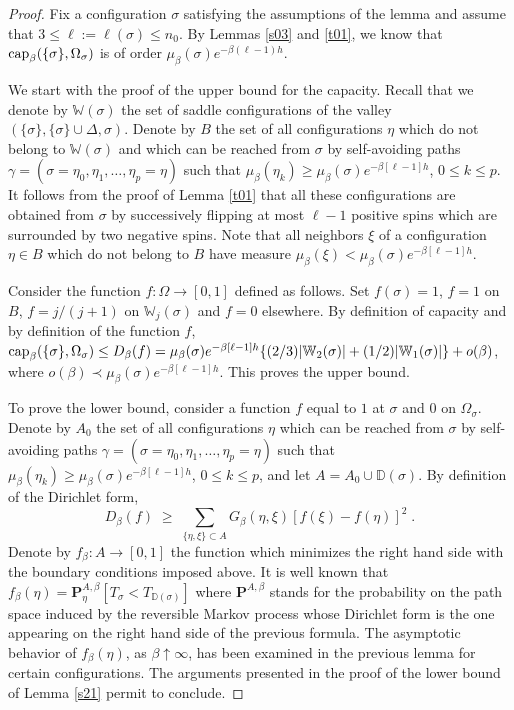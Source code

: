 \documentclass[reqno]{amsart}
\begin{document}
\begin{proof}
Fix a configuration $\sigma$ satisfying the assumptions of the lemma
and assume that $3\le \ell :=\ell(\sigma) \le n_0$. By Lemmas
\ref{s03} and \ref{t01}, we know that ${{\rm cap}}_\beta(\{\sigma\} ,
\Omega_\sigma)$ is of order $\mu_\beta (\sigma) e^{- \beta (\ell -1)
  h}$.

We start with the proof of the upper bound for the capacity.  Recall
that we denote by ${{\mathbb W}}(\sigma)$ the set of saddle configurations of
the valley $(\{\sigma\}, \{\sigma\} \cup \Delta, \sigma)$.  Denote by
$B$ the set of all configurations $\eta$ which do not belong to ${{\mathbb W}}(\sigma)$ and which can be reached from $\sigma$ by self-avoiding
paths $\gamma = (\sigma = \eta_0, \eta_1, \dots, \eta_p = \eta)$ such
that $\mu_\beta (\eta_k) \ge \mu_\beta (\sigma) e^{- \beta [\ell -1]
  h}$, $0\le k\le p$. It follows from the proof of Lemma \ref{t01}
that all these configurations are obtained from $\sigma$ by
successively flipping at most $\ell-1$ positive spins which are
surrounded by two negative spins. Note that all neighbors $\xi$ of a
configuration $\eta \in B$ which do not belong to $B$ have measure
$\mu_\beta (\xi) < \mu_\beta (\sigma) e^{- \beta [\ell -1] h}$.

Consider the function $f:\Omega \to [0,1]$ defined as follows.  Set
$f(\sigma)=1$, $f=1$ on $B$, $f=j/(j+1)$ on ${{\mathbb W}}_j(\sigma)$ and
$f=0$ elsewhere. By definition of capacity and by definition of the
function $f$, ${{\rm cap}}_\beta (\{\sigma\} , \Omega_\sigma) \le D_\beta(f)
= \mu_\beta (\sigma) e^{- \beta [\ell -1] h} \{(2/3) |{{\mathbb W}}_2(\sigma)|
+ (1/2) |{{\mathbb W}}_1(\sigma)|\} + o(\beta)$, where $o(\beta) \prec
\mu_\beta (\sigma) e^{- \beta [\ell -1] h}$.  This proves the upper
bound.

To prove the lower bound, consider a function $f$ equal to $1$ at
$\sigma$ and $0$ on $\Omega_\sigma$. Denote by $A_0$ the set of all
configurations $\eta$ which can be reached from $\sigma$ by
self-avoiding paths $\gamma = (\sigma = \eta_0, \eta_1, \dots, \eta_p
= \eta)$ such that $\mu_\beta (\eta_k) \ge \mu_\beta (\sigma) e^{-
  \beta [\ell -1] h}$, $0\le k\le p$, and let $A=A_0 \cup {{\mathbb D}}(\sigma)$. By definition of the Dirichlet form,
\begin{equation*}
D_\beta(f) \;\ge\; \sum_{\{\eta, \xi\}\subset A} G_\beta(\eta,\xi)
[f(\xi)-f(\eta)]^2 \;.
\end{equation*}
Denote by $f_\beta : A\to [0,1]$ the function which minimizes the
right hand side with the boundary conditions imposed above. It is well
known that $f_\beta(\eta) = {{\mathbf P}}^{A,\beta}_\eta [T_\sigma < T_{{{\mathbb D}}(\sigma)}]$ where ${{\mathbf P}}^{A,\beta}$ stands for the probability on
the path space induced by the reversible Markov process whose
Dirichlet form is the one appearing on the right hand side of the
previous formula. The asymptotic behavior of $f_\beta (\eta)$, as
$\beta\uparrow\infty$, has been examined in the previous lemma for
certain configurations. The arguments presented in the proof of the
lower bound of Lemma \ref{s21} permit to conclude.


\end{proof}
\end{document}
